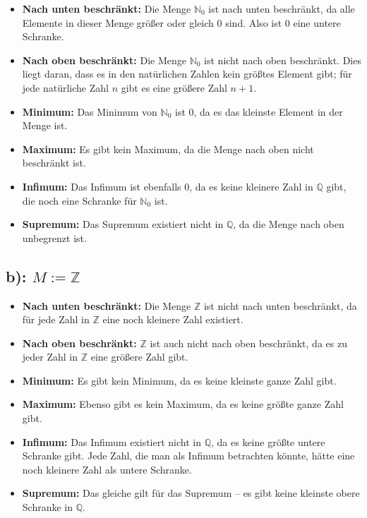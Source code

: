 \documentclass{article}
\theoremstyle{definition}
\theoremstyle{remark}
\begin{document}
\begin{itemize}
	\item \textbf{Nach unten beschränkt:} Die Menge \( \mathbb{N}_0 \) ist nach unten beschränkt, da alle Elemente in dieser Menge größer oder gleich 0 sind. Also ist 0 eine untere Schranke.
	\item \textbf{Nach oben beschränkt:} Die Menge \( \mathbb{N}_0 \) ist nicht nach oben beschränkt. Dies liegt daran, dass es in den natürlichen Zahlen kein größtes Element gibt; für jede natürliche Zahl \( n \) gibt es eine größere Zahl \( n+1 \).
	\item \textbf{Minimum:} Das Minimum von \( \mathbb{N}_0 \) ist 0, da es das kleinste Element in der Menge ist.
	\item \textbf{Maximum:} Es gibt kein Maximum, da die Menge nach oben nicht beschränkt ist.
	\item \textbf{Infimum:} Das Infimum ist ebenfalls 0, da es keine kleinere Zahl in \( \mathbb{Q} \) gibt, die noch eine Schranke für \( \mathbb{N}_0 \) ist.
	\item \textbf{Supremum:} Das Supremum existiert nicht in \( \mathbb{Q} \), da die Menge nach oben unbegrenzt ist.
\end{itemize}

\subsection*{b): \( M := \mathbb{Z} \)}

\begin{itemize}
	\item \textbf{Nach unten beschränkt:} Die Menge \( \mathbb{Z} \) ist nicht nach unten beschränkt, da für jede Zahl in \( \mathbb{Z} \) eine noch kleinere Zahl existiert.
	\item \textbf{Nach oben beschränkt:} \( \mathbb{Z} \) ist auch nicht nach oben beschränkt, da es zu jeder Zahl in \( \mathbb{Z} \) eine größere Zahl gibt.
	\item \textbf{Minimum:} Es gibt kein Minimum, da es keine kleinste ganze Zahl gibt.
	\item \textbf{Maximum:} Ebenso gibt es kein Maximum, da es keine größte ganze Zahl gibt.
	\item \textbf{Infimum:} Das Infimum existiert nicht in \( \mathbb{Q} \), da es keine größte untere Schranke gibt. Jede Zahl, die man als Infimum betrachten könnte, hätte eine noch kleinere Zahl als untere Schranke.
	\item \textbf{Supremum:} Das gleiche gilt für das Supremum – es gibt keine kleinste obere Schranke in \( \mathbb{Q} \).
\end{itemize}
\end{document}
